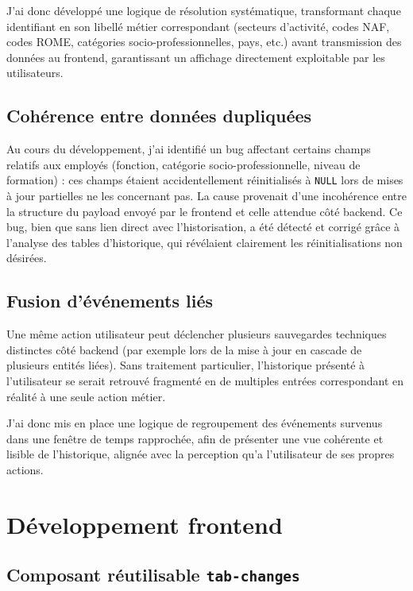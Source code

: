 J'ai donc développé une logique de résolution systématique, transformant
chaque identifiant en son libellé métier correspondant (secteurs
d'activité, codes NAF, codes ROME, catégories socio-professionnelles,
pays, etc.) avant transmission des données au frontend, garantissant un
affichage directement exploitable par les utilisateurs.

\subsection{Cohérence entre données dupliquées}

Au cours du développement, j'ai identifié un bug affectant certains
champs relatifs aux employés (fonction, catégorie socio-professionnelle,
niveau de formation) : ces champs étaient accidentellement réinitialisés
à \texttt{NULL} lors de mises à jour partielles ne les concernant pas. La
cause provenait d'une incohérence entre la structure du payload envoyé
par le frontend et celle attendue côté backend. Ce bug, bien que sans
lien direct avec l'historisation, a été détecté et corrigé grâce à
l'analyse des tables d'historique, qui révélaient clairement les
réinitialisations non désirées.

\subsection{Fusion d'événements liés}

Une même action utilisateur peut déclencher plusieurs sauvegardes
techniques distinctes côté backend (par exemple lors de la mise à jour
en cascade de plusieurs entités liées). Sans traitement particulier,
l'historique présenté à l'utilisateur se serait retrouvé fragmenté en de
multiples entrées correspondant en réalité à une seule action métier.

J'ai donc mis en place une logique de regroupement des événements
survenus dans une fenêtre de temps rapprochée, afin de présenter une vue
cohérente et lisible de l'historique, alignée avec la perception qu'a
l'utilisateur de ses propres actions.

\section{Développement frontend}

\subsection{Composant réutilisable \texttt{tab-changes}}

